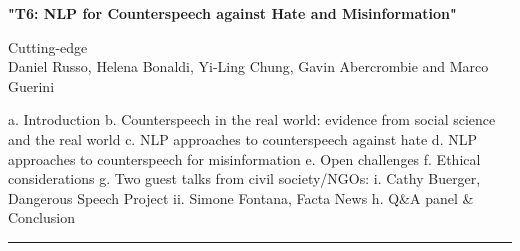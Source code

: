 \begin{center}
    \Large{\textbf{"T6: NLP for Counterspeech against Hate and Misinformation"}\\}
    \par\bigskip
    \large{Cutting-edge}\\
    \large{Daniel Russo, Helena Bonaldi, Yi-Ling Chung, Gavin Abercrombie and Marco Guerini}\\
    \par\bigskip

\end{center}

a. Introduction
b. Counterspeech in the real world: evidence from social science and the real world
c. NLP approaches to counterspeech against hate
d. NLP approaches to counterspeech for misinformation 
e. Open challenges 
f. Ethical considerations 
g. Two guest talks from civil society/NGOs:
    i. Cathy Buerger, Dangerous Speech Project
    ii. Simone Fontana, Facta News
h. Q&A panel & Conclusion

\begin{center}
    \noindent\rule{200px}{1pt}
\end{center}
